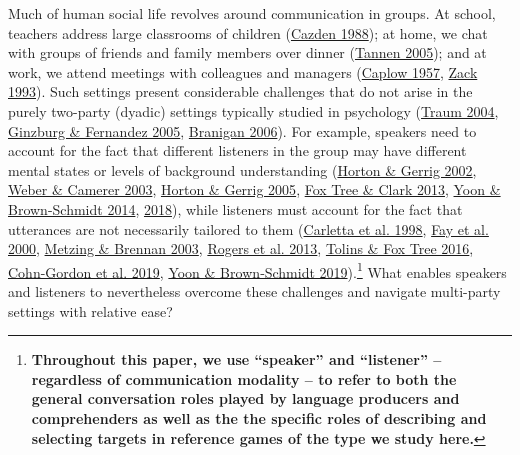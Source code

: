 \documentclass[
  english,
]{article}
\begin{document}
Much of human social life revolves around communication in groups.
At school, teachers address large classrooms of children (\protect\hyperlink{ref-cazden1988classroom}{Cazden 1988}); at home, we chat with groups of friends and family members over dinner (\protect\hyperlink{ref-tannen2005conversational}{Tannen 2005}); and at work, we attend meetings with colleagues and managers (\protect\hyperlink{ref-caplow1957organizational}{Caplow 1957}, \protect\hyperlink{ref-zack1993interactivity}{Zack 1993}).
Such settings present considerable challenges that do not arise in the purely two-party (dyadic) settings typically studied in psychology (\protect\hyperlink{ref-traum2004}{Traum 2004}, \protect\hyperlink{ref-ginzburg2005}{Ginzburg \& Fernandez 2005}, \protect\hyperlink{ref-branigan2006}{Branigan 2006}).
For example, speakers need to account for the fact that different listeners in the group may have different mental states or levels of background understanding (\protect\hyperlink{ref-horton2002}{Horton \& Gerrig 2002}, \protect\hyperlink{ref-weber2003}{Weber \& Camerer 2003}, \protect\hyperlink{ref-horton2005}{Horton \& Gerrig 2005}, \protect\hyperlink{ref-fox-tree2013}{Fox Tree \& Clark 2013}, \protect\hyperlink{ref-yoon2014}{Yoon \& Brown-Schmidt 2014}, \protect\hyperlink{ref-yoon2018}{2018}), while listeners must account for the fact that utterances are not necessarily tailored to them (\protect\hyperlink{ref-carletta1998}{Carletta et al. 1998}, \protect\hyperlink{ref-fay2000}{Fay et al. 2000}, \protect\hyperlink{ref-metzing2003}{Metzing \& Brennan 2003}, \protect\hyperlink{ref-rogers2013}{Rogers et al. 2013}, \protect\hyperlink{ref-tolins2016}{Tolins \& Fox Tree 2016}, \protect\hyperlink{ref-cohngordon}{Cohn-Gordon et al. 2019}, \protect\hyperlink{ref-yoon2019}{Yoon \& Brown‐Schmidt 2019}).\footnote{\textbf{Throughout this paper, we use ``speaker'' and ``listener'' -- regardless of communication modality -- to refer to both the general conversation roles played by language producers and comprehenders as well as the the specific roles of describing and selecting targets in reference games of the type we study here.}}
What enables speakers and listeners to nevertheless overcome these challenges and navigate multi-party settings with relative ease?
\end{document}
